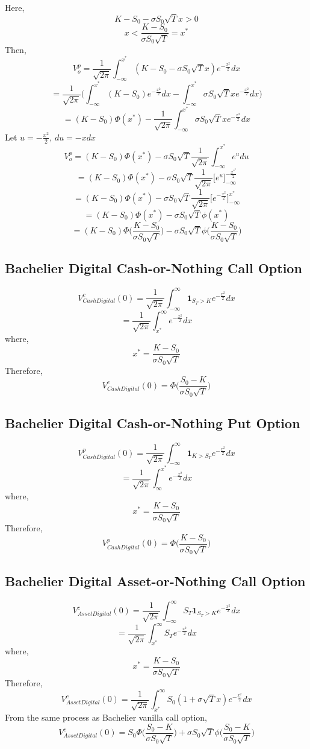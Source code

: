 \documentclass{article}
\begin{document}
Here,
$$
K - S_0 - \sigma S_0\sqrt{T}x >0
$$$$
x < \frac{K-S_0}{\sigma S_0\sqrt{T}} = x^{*}
$$
Then,
$$
V_o^{p} = \frac{1}{\sqrt{2\pi}}\int_{-\infty}^{x^{*}}(K-S_0 - \sigma S_0\sqrt{T}x)e^{-\frac{x^{2}}{2}}dx
$$$$
= \frac{1}{\sqrt{2\pi}}\Bigg(\int_{-\infty}^{x^{*}}(K-S_0)e^{-\frac{x^{2}}{2}}dx - \int_{-\infty}^{x^{*}}\sigma S_0\sqrt{T}xe^{-\frac{x^{2}}{2}}dx\Bigg)
$$$$
=(K-S_0)\Phi(x^{*}) - \frac{1}{\sqrt{2\pi}}\int_{-\infty}^{x^{*}}\sigma S_0\sqrt{T}xe^{-\frac{x^{2}}{2}}dx
$$
Let $ u = -\frac{x^{2}}{2} $, $du = -xdx$
$$
V_o^{p} =(K-S_0)\Phi(x^{*}) - \sigma S_0\sqrt{T}\frac{1}{\sqrt{2\pi}}\int_{-\infty}^{x^{*}}e^{u}du
$$$$
= (K-S_0)\Phi(x^{*}) - \sigma S_0\sqrt{T}\frac{1}{\sqrt{2\pi}}\big[e^{u}\big]_{-\infty}^{-\frac{x^{{*}^{2}}}{2}}
$$$$
= (K-S_0)\Phi(x^{*}) - \sigma S_0\sqrt{T}\frac{1}{\sqrt{2\pi}}\bigg[e^{-\frac{x^{2}}{2}}\bigg]_{-\infty}^{x^{*}}
$$$$
= (K-S_0)\Phi(x^{*}) - \sigma S_0\sqrt{T}\phi(x^{*})
$$
$$
= (K-S_0)\Phi\bigg(\frac{K-S_0}{\sigma S_0\sqrt{T}}\bigg) - \sigma S_0\sqrt{T}\phi\bigg(\frac{K-S_0}{\sigma S_0\sqrt{T}}\bigg)
$$

\subsection{Bachelier Digital Cash-or-Nothing Call Option}
$$
V^{c}_{Cash Digital}(0) = \frac{1}{\sqrt{2\pi}}\int_{-\infty}^{\infty}\mathbf{1}_{S_T>K}e^{-\frac{x^{2}}{2}}dx
$$
$$
= \frac{1}{\sqrt{2\pi}}\int_{x^{*}}^{\infty}e^{-\frac{x^{2}}{2}}dx
$$
where,
$$
x^{*} = \frac{K-S_0}{\sigma S_0\sqrt{T}}
$$
Therefore,
$$
V^{c}_{Cash Digital}(0) = \Phi\bigg(\frac{S_0-K}{\sigma S_0\sqrt{T}}\bigg)
$$

\subsection{Bachelier Digital Cash-or-Nothing Put Option}
$$
V^{p}_{Cash Digital}(0) = \frac{1}{\sqrt{2\pi}}\int_{-\infty}^{\infty}\mathbf{1}_{K>S_T}e^{-\frac{x^{2}}{2}}dx
$$
$$
= \frac{1}{\sqrt{2\pi}}\int_{\infty}^{x^{*}}e^{-\frac{x^{2}}{2}}dx
$$
where,
$$
x^{*} = \frac{K-S_0}{\sigma S_0\sqrt{T}} 
$$
Therefore,
$$
V^{p}_{Cash Digital}(0) = \Phi\bigg(\frac{K-S_0}{\sigma S_0\sqrt{T}}\bigg)
$$
\subsection{Bachelier Digital Asset-or-Nothing Call Option}
$$
V^{c}_{Asset Digital}(0) = \frac{1}{\sqrt{2\pi}}\int_{-\infty}^{\infty}S_T\mathbf{1}_{S_T>K}e^{-\frac{x^{2}}{2}}dx
$$
$$
= \frac{1}{\sqrt{2\pi}}\int_{x^{*}}^{\infty}S_Te^{-\frac{x^{2}}{2}}dx
$$
where,
$$
x^{*} = \frac{K-S_0}{\sigma S_0\sqrt{T}}
$$
Therefore,
$$
V^{c}_{Asset Digital}(0) = \frac{1}{\sqrt{2\pi}}\int_{x^{*}}^{\infty} S_0(1 + \sigma \sqrt{T}x)e^{-\frac{x^{2}}{2}}dx
$$
From the same process as Bachelier vanilla call option,
$$
V^{c}_{Asset Digital}(0) = S_0\Phi\bigg(\frac{S_0-K}{\sigma S_0\sqrt{T}}\Big) + \sigma S_0\sqrt{T}\phi\Big(\frac{S_0-K}{\sigma S_0\sqrt{T}}\bigg)
$$
\end{document}
